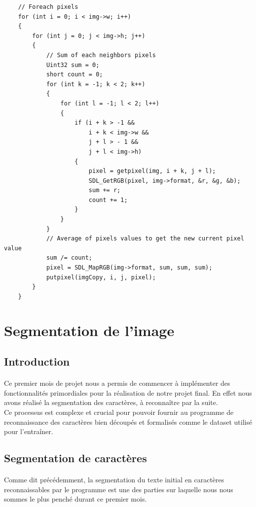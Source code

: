 \documentclass{article}
\begin{document}
\begin{lstlisting}
	// Foreach pixels
    for (int i = 0; i < img->w; i++)
    {
        for (int j = 0; j < img->h; j++)
        {
            // Sum of each neighbors pixels
            Uint32 sum = 0;
            short count = 0;
            for (int k = -1; k < 2; k++)
            {
                for (int l = -1; l < 2; l++)
                {
                    if (i + k > -1 && 
                        i + k < img->w && 
                        j + l > - 1 && 
                        j + l < img->h) 
                    {
                        pixel = getpixel(img, i + k, j + l);
                        SDL_GetRGB(pixel, img->format, &r, &g, &b);
                        sum += r;
                        count += 1;
                    }
                }
            }
            // Average of pixels values to get the new current pixel value
            sum /= count;
            pixel = SDL_MapRGB(img->format, sum, sum, sum);
            putpixel(imgCopy, i, j, pixel);
        }
    }
\end{lstlisting}


\newpage
{}
\section{Segmentation de l'image}
\subsection{Introduction}
    \paragraph{}
    Ce premier mois de projet nous a permis de commencer à implémenter des fonctionnalités primordiales pour la réalisation de notre projet final. En effet nous avons réalisé la segmentation des caractères, à reconnaître par la suite. \\
    Ce processus est complexe et crucial pour pouvoir fournir au programme de reconnaissance des caractères bien découpés et formalisés comme le dataset utilisé pour l'entraîner.
    
\subsection{Segmentation de caractères}
    \paragraph{}
    Comme dit précédemment, la segmentation du texte initial en caractères reconnaissables par le programme est une des parties sur laquelle nous nous sommes le plus penché durant ce premier mois.
    
\end{document}
